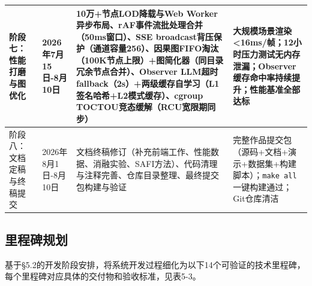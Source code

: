 \documentclass[a4paper]{ctexart}
\makeatletter
\renewcommand{\_}{%
  \ifmmode
    \nfss@text{\textunderscore}%
  \else
    \textunderscore\discretionary{}{}{}%
  \fi}
\makeatother
\begin{document}
{\begin{longtable}{p{3.5cm} >{\raggedright\arraybackslash}p{2.6cm} >{\raggedright\arraybackslash}p{4.8cm} >{\raggedright\arraybackslash}p{3.5cm}}
\hline
阶段七：性能打磨与图优化 & 2026年7月15日-8月10日 & 10万+节点LOD降载与Web Worker异步布局、rAF事件流批处理合并（50ms窗口）、SSE broadcast背压保护（通道容量256）、因果图FIFO淘汰（100K节点上限）+图简化器（同目录冗余节点合并）、Observer LLM超时fallback（2s）+两级缓存自学习（L1签名哈希+L2模式缓存）、cgroup TOCTOU竞态缓解（RCU宽限期同步） & 大规模场景渲染<16ms/帧；12小时压力测试无内存泄漏；Observer缓存命中率持续提升；性能基准全部达标 \\
\hline
阶段八：文档定稿与终稿提交 & 2026年8月1日-8月10日 & 文档终稿修订（补充前端工作、性能数据、消融实验、SAFI方法）、代码清理与注释完善、仓库目录整理、最终提交包构建与验证 & 完整作品提交包（源码+文档+演示+数据集+构建脚本）；\texttt{make all}一键构建通过；Git仓库清洁 \\
\hline
\end{longtable}
\par}


\subsection{里程碑规划}



基于§5.2的开发阶段安排，将系统开发过程细化为以下14个可验证的技术里程碑，每个里程碑对应具体的交付物和验收标准，见表5-3。
\end{document}
